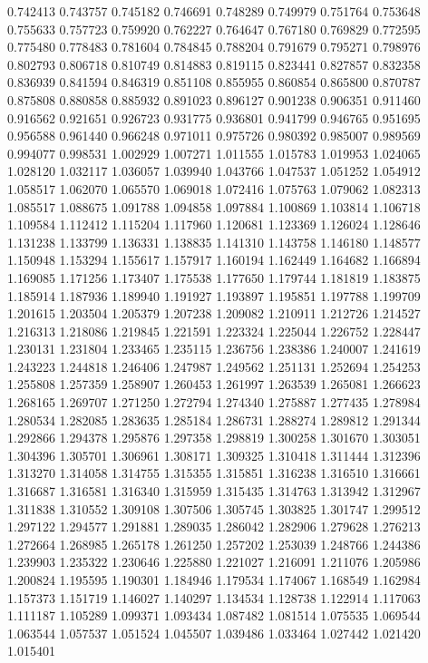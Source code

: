 0.742413
0.743757
0.745182
0.746691
0.748289
0.749979
0.751764
0.753648
0.755633
0.757723
0.759920
0.762227
0.764647
0.767180
0.769829
0.772595
0.775480
0.778483
0.781604
0.784845
0.788204
0.791679
0.795271
0.798976
0.802793
0.806718
0.810749
0.814883
0.819115
0.823441
0.827857
0.832358
0.836939
0.841594
0.846319
0.851108
0.855955
0.860854
0.865800
0.870787
0.875808
0.880858
0.885932
0.891023
0.896127
0.901238
0.906351
0.911460
0.916562
0.921651
0.926723
0.931775
0.936801
0.941799
0.946765
0.951695
0.956588
0.961440
0.966248
0.971011
0.975726
0.980392
0.985007
0.989569
0.994077
0.998531
1.002929
1.007271
1.011555
1.015783
1.019953
1.024065
1.028120
1.032117
1.036057
1.039940
1.043766
1.047537
1.051252
1.054912
1.058517
1.062070
1.065570
1.069018
1.072416
1.075763
1.079062
1.082313
1.085517
1.088675
1.091788
1.094858
1.097884
1.100869
1.103814
1.106718
1.109584
1.112412
1.115204
1.117960
1.120681
1.123369
1.126024
1.128646
1.131238
1.133799
1.136331
1.138835
1.141310
1.143758
1.146180
1.148577
1.150948
1.153294
1.155617
1.157917
1.160194
1.162449
1.164682
1.166894
1.169085
1.171256
1.173407
1.175538
1.177650
1.179744
1.181819
1.183875
1.185914
1.187936
1.189940
1.191927
1.193897
1.195851
1.197788
1.199709
1.201615
1.203504
1.205379
1.207238
1.209082
1.210911
1.212726
1.214527
1.216313
1.218086
1.219845
1.221591
1.223324
1.225044
1.226752
1.228447
1.230131
1.231804
1.233465
1.235115
1.236756
1.238386
1.240007
1.241619
1.243223
1.244818
1.246406
1.247987
1.249562
1.251131
1.252694
1.254253
1.255808
1.257359
1.258907
1.260453
1.261997
1.263539
1.265081
1.266623
1.268165
1.269707
1.271250
1.272794
1.274340
1.275887
1.277435
1.278984
1.280534
1.282085
1.283635
1.285184
1.286731
1.288274
1.289812
1.291344
1.292866
1.294378
1.295876
1.297358
1.298819
1.300258
1.301670
1.303051
1.304396
1.305701
1.306961
1.308171
1.309325
1.310418
1.311444
1.312396
1.313270
1.314058
1.314755
1.315355
1.315851
1.316238
1.316510
1.316661
1.316687
1.316581
1.316340
1.315959
1.315435
1.314763
1.313942
1.312967
1.311838
1.310552
1.309108
1.307506
1.305745
1.303825
1.301747
1.299512
1.297122
1.294577
1.291881
1.289035
1.286042
1.282906
1.279628
1.276213
1.272664
1.268985
1.265178
1.261250
1.257202
1.253039
1.248766
1.244386
1.239903
1.235322
1.230646
1.225880
1.221027
1.216091
1.211076
1.205986
1.200824
1.195595
1.190301
1.184946
1.179534
1.174067
1.168549
1.162984
1.157373
1.151719
1.146027
1.140297
1.134534
1.128738
1.122914
1.117063
1.111187
1.105289
1.099371
1.093434
1.087482
1.081514
1.075535
1.069544
1.063544
1.057537
1.051524
1.045507
1.039486
1.033464
1.027442
1.021420
1.015401
